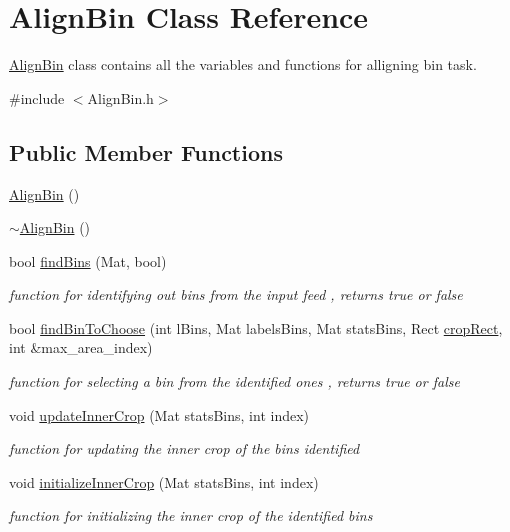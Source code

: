 \hypertarget{classAlignBin}{}\section{Align\+Bin Class Reference}
\label{classAlignBin}


\hyperlink{classAlignBin}{Align\+Bin} class contains all the variables and functions for alligning bin task.  




{\ttfamily \#include $<$Align\+Bin.\+h$>$}

\subsection*{Public Member Functions}
\begin{DoxyCompactItemize}
\item 
\hyperlink{classAlignBin_a26fa4825f5622fa0448735154ec4366a}{Align\+Bin} ()
\item 
\hyperlink{classAlignBin_a9c29537d13848018a211141798f40e58}{$\sim$\+Align\+Bin} ()
\item 
bool \hyperlink{classAlignBin_a7b952f6038c2c39e23284d1fe37988b6}{find\+Bins} (Mat, bool)
\begin{DoxyCompactList}\small\item\em function for identifying out bins from the input feed , returns true or false \end{DoxyCompactList}\item 
bool \hyperlink{classAlignBin_a7b178f98348112e3648f260bfcb4528d}{find\+Bin\+To\+Choose} (int l\+Bins, Mat labels\+Bins, Mat stats\+Bins, Rect \hyperlink{BinsTask_8cpp_a5e48b467c036f0138a4336c5f73dd0ef}{crop\+Rect}, int \&max\+\_\+area\+\_\+index)
\begin{DoxyCompactList}\small\item\em function for selecting a bin from the identified ones , returns true or false \end{DoxyCompactList}\item 
void \hyperlink{classAlignBin_a7f071885a59bf92b4f84a3d7ed94d3fa}{update\+Inner\+Crop} (Mat stats\+Bins, int index)
\begin{DoxyCompactList}\small\item\em function for updating the inner crop of the bins identified \end{DoxyCompactList}\item 
void \hyperlink{classAlignBin_a1b74035bb712d1b2337f8b07c1096d08}{initialize\+Inner\+Crop} (Mat stats\+Bins, int index)
\begin{DoxyCompactList}\small\item\em function for initializing the inner crop of the identified bins \end{DoxyCompactList}\end{DoxyCompactItemize}
